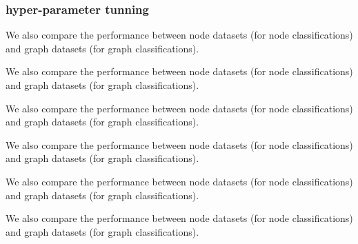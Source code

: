\documentclass[sigconf]{acmart}
\begin{document}
\subsubsection{hyper-parameter tunning}

We also compare the performance between node datasets (for node classifications) and graph datasets (for graph classifications).

We also compare the performance between node datasets (for node classifications) and graph datasets (for graph classifications).

We also compare the performance between node datasets (for node classifications) and graph datasets (for graph classifications).



We also compare the performance between node datasets (for node classifications) and graph datasets (for graph classifications).


We also compare the performance between node datasets (for node classifications) and graph datasets (for graph classifications).


We also compare the performance between node datasets (for node classifications) and graph datasets (for graph classifications).
\end{document}
